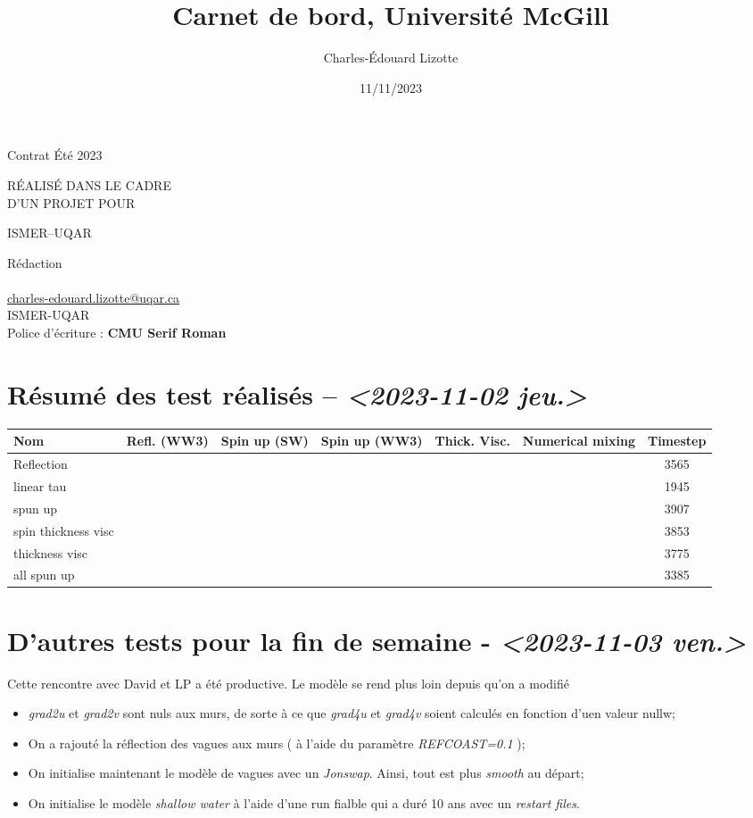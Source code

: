 \documentclass[10pt]{article}
\author{Charles-Édouard Lizotte}
\date{11/11/2023}
\title{Carnet de bord, Université McGill}
\makeatletter
\numberwithin{equation}{section}
\newcommand{\cmark}{\ding{52}}
\newcommand{\xmark}{\ding{55}}
\newcommand{\mytitlepage}{
\begin{titlepage}
\begin{center}
{\Large Contrat Été 2023 \par}
\vspace{2cm}
{\Large \MakeUppercase{\thetitle} \par}
\vspace{2cm}
RÉALISÉ DANS LE CADRE\\ D'UN PROJET POUR \par
\vspace{2cm}
{\Large ISMER--UQAR \par}
\vspace{2cm}
{\thedate}
\end{center}
\vfill
Rédaction \\
{\theauthor}\\
\url{charles-edouard.lizotte@uqar.ca}\\
ISMER-UQAR\\
Police d'écriture : \textbf{CMU Serif Roman}
\end{titlepage}
}
\makeatother
\begin{document}
\mytitlepage
\tableofcontents\newpage

\section{Résumé des test réalisés -- \textit{<2023-11-02 jeu.>}}
\label{sec:org320fae8}
\begin{center}
\begin{tabular}{lcccccc}
Nom & Refl. (WW3) & Spin up (SW) & Spin up (WW3) & Thick. Visc. & Numerical mixing & Timestep\\[0pt]
\hline
\hline
Reflection & \cmark & \xmark & \cmark & \xmark & \cmark & 3565\\[0pt]
linear tau & \xmark & \xmark & \xmark & \xmark & \cmark & 1945\\[0pt]
spun up & \xmark & \cmark & \xmark & \xmark & \cmark & 3907\\[0pt]
spin thickness visc & \xmark & \cmark & \xmark & \cmark & \xmark & 3853\\[0pt]
thickness visc & \xmark & \xmark & \xmark & \cmark & \xmark & 3775\\[0pt]
all spun up & \cmark & \cmark & \cmark & \xmark & \xmark & 3385\\[0pt]
\hline
\end{tabular}
\end{center}



\section{D'autres tests pour la fin de semaine - \textit{<2023-11-03 ven.>}}
\label{sec:org24b6be4}

Cette rencontre avec David et LP a été productive.
Le modèle se rend plus loin depuis qu'on a modifié
\begin{itemize}
\item \emph{grad2u} et \emph{grad2v} sont nuls aux murs, de sorte à ce que \emph{grad4u} et \emph{grad4v} soient calculés en fonction d'uen valeur nullw;
\item On a rajouté la réflection des vagues aux murs ( à l'aide du paramètre \emph{REFCOAST=0.1} );
\item On initialise maintenant le modèle de vagues avec un \emph{Jonswap}.
Ainsi, tout est plus \emph{smooth} au départ;
\item On initialise le modèle \emph{shallow water} à l'aide d'une run fialble qui a duré 10 ans avec un \emph{restart files}.
\end{itemize}
\end{document}

